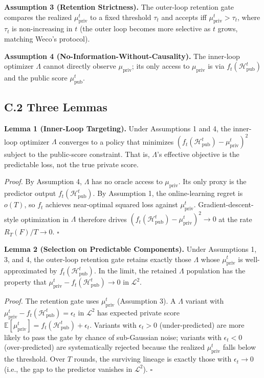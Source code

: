 \textbf{Assumption 3 (Retention Strictness).} The outer-loop retention gate compares the realized $\mu_{\text{priv}}^t$ to a fixed threshold $\tau_t$ and accepts iff $\mu_{\text{priv}}^t > \tau_t$, where $\tau_t$ is non-increasing in $t$ (the outer loop becomes more selective as $t$ grows, matching Weco's protocol).

\textbf{Assumption 4 (No-Information-Without-Causality).} The inner-loop optimizer $\Lambda$ cannot directly observe $\mu_{\text{priv}}$; its only access to $\mu_{\text{priv}}$ is via $f_t(\mathcal{H}_{\text{pub}}^t)$ and the public score $\mu_{\text{pub}}^t$.

\subsection*{C.2 Three Lemmas}

\textbf{Lemma 1 (Inner-Loop Targeting).} Under Assumptions 1 and 4, the inner-loop optimizer $\Lambda$ converges to a policy that minimizes $(f_t(\mathcal{H}_{\text{pub}}^t) - \mu_{\text{priv}}^t)^2$ subject to the public-score constraint. That is, $\Lambda$'s effective objective is the predictable loss, not the true private score.

\textit{Proof.} By Assumption 4, $\Lambda$ has no oracle access to $\mu_{\text{priv}}$. Its only proxy is the predictor output $f_t(\mathcal{H}_{\text{pub}}^t)$. By Assumption 1, the online-learning regret is $o(T)$, so $f_t$ achieves near-optimal squared loss against $\mu_{\text{priv}}^t$. Gradient-descent-style optimization in $\Lambda$ therefore drives $(f_t(\mathcal{H}_{\text{pub}}^t) - \mu_{\text{priv}}^t)^2 \to 0$ at the rate $R_T(F)/T \to 0$. \hfill$\square$

\textbf{Lemma 2 (Selection on Predictable Components).} Under Assumptions 1, 3, and 4, the outer-loop retention gate retains exactly those $\Lambda$ whose $\mu_{\text{priv}}^t$ is well-approximated by $f_t(\mathcal{H}_{\text{pub}}^t)$. In the limit, the retained $\Lambda$ population has the property that $\mu_{\text{priv}}^t - f_t(\mathcal{H}_{\text{pub}}^t) \to 0$ in $\mathcal{L}^2$.

\textit{Proof.} The retention gate uses $\mu_{\text{priv}}^t$ (Assumption 3). A $\Lambda$ variant with $\mu_{\text{priv}}^t - f_t(\mathcal{H}_{\text{pub}}^t) = \epsilon_t$ in $\mathcal{L}^2$ has expected private score $\mathbb{E}[\mu_{\text{priv}}^t] = f_t(\mathcal{H}_{\text{pub}}^t) + \epsilon_t$. Variants with $\epsilon_t > 0$ (under-predicted) are more likely to pass the gate by chance of sub-Gaussian noise; variants with $\epsilon_t < 0$ (over-predicted) are systematically rejected because the realized $\mu_{\text{priv}}^t$ falls below the threshold. Over $T$ rounds, the surviving lineage is exactly those with $\epsilon_t \to 0$ (i.e., the gap to the predictor vanishes in $\mathcal{L}^2$). \hfill$\square$

